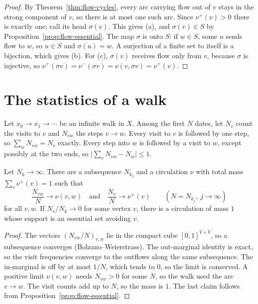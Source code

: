 \begin{proof}
By Theorem~\ref{thm:flow-cycles}, every arc carrying flow out of \(v\) stays in the strong
component of \(v\), so there is at most one such arc. Since \(\nu^+(v)>0\) there is exactly one;
call its head \(\sigma(v)\). This gives (a), and \(\sigma(v)\in S\) by
Proposition~\ref{prop:flow-essential}. The map \(\sigma\) is onto \(S\): if \(w\in S\), some
\(u\) sends flow to \(w\), so \(u\in S\) and \(\sigma(u)=w\). A surjection of a finite set to
itself is a bijection, which gives (b). For (c), \(\sigma(v)\) receives flow only from \(v\),
because \(\sigma\) is injective, so \(\nu^+(\sigma v)=\nu^-(\sigma v)=\nu(v,\sigma v)=\nu^+(v)\).
\end{proof}

\section{The statistics of a walk}

Let \(x_0\to x_1\to\cdots\) be an infinite walk in \(X\). Among the first \(N\) dates, let
\(N_v\) count the visits to \(v\) and \(N_{vw}\) the steps \(v\to w\). Every visit to \(v\) is
followed by one step, so \(\sum_w N_{vw}=N_v\) exactly. Every step into \(w\) is followed by a
visit to \(w\), except possibly at the two ends, so \(\bigl|\sum_vN_{vw}-N_w\bigr|\le1\).

\begin{theorem}\label{thm:balance}
Let \(N_k\to\infty\). There are a subsequence \(N_{k_j}\) and a circulation \(\nu\) with total
mass \(\sum_v\nu^+(v)=1\) such that
\[
  \frac{N_{vw}}{N}\to\nu(v,w)\quad\text{and}\quad\frac{N_v}{N}\to\nu^+(v)
  \qquad(N=N_{k_j},\ j\to\infty)
\]
for all \(v,w\). If \(N_v/N_k\to0\) for some vertex \(v\), there is a circulation of mass
\(1\) whose support is an essential set avoiding \(v\).
\end{theorem}

\begin{proof}
The vectors \((N_{vw}/N)_{v,w}\) lie in the compact cube \([0,1]^{V\times V}\), so a
subsequence converges (Bolzano--Weierstrass). The out-marginal identity is exact, so the visit
frequencies converge to the outflows along the same subsequence. The in-marginal is off by at
most \(1/N\), which tends to \(0\), so the limit is conserved. A positive limit \(\nu(v,w)\)
needs \(N_{vw}>0\) for some \(N\), so the walk used the arc \(v\to w\). The visit counts add up
to \(N\), so the mass is \(1\). The last claim follows from Proposition~\ref{prop:flow-essential}.
\end{proof}

